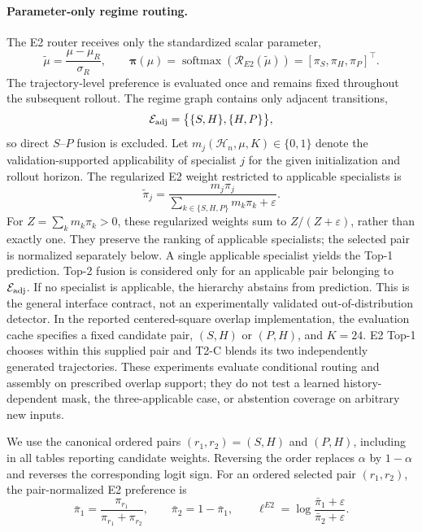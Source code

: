 \documentclass{article}
\begin{document}
\paragraph{Parameter-only regime routing.}
The E2 router receives only the standardized scalar parameter,
\begin{equation}
  \widetilde\mu
  =
  \frac{\mu-\mu_R}{\sigma_R},
  \qquad
  \bm\pi(\mu)
  =
  \operatorname{softmax}
  \left(
    \mathcal R_{E2}(\widetilde\mu)
  \right)
  =
  [\pi_S,\pi_H,\pi_P]^\top .
  \label{eq:app_e2_parameter_only}
\end{equation}
The trajectory-level preference is evaluated once and remains fixed
throughout the subsequent rollout. The regime graph contains only adjacent transitions,
\begin{equation}
  \mathcal E_{\rm adj}
  =
  \bigl\{
    \{S,H\},
    \{H,P\}
  \bigr\},
  \label{eq:app_adjacency}
\end{equation}
so direct $S$--$P$ fusion is excluded.
Let
$m_j(\mathcal H_n,\mu,K)\in\{0,1\}$
denote the validation-supported applicability of specialist $j$ for the
given initialization and rollout horizon.
The regularized E2 weight restricted to applicable specialists is
\begin{equation}
  \widetilde\pi_j
  =
  \frac{
    m_j\pi_j
  }{
    \sum_{k\in\{S,H,P\}}m_k\pi_k+\varepsilon
  }.
  \label{eq:app_masked_e2}
\end{equation}
For $Z=\sum_k m_k\pi_k>0$, these regularized weights sum to $Z/(Z+\varepsilon)$, rather than exactly one. They preserve the ranking of applicable specialists; the selected pair is normalized separately below. A single applicable specialist yields the Top-1 prediction.
Top-2 fusion is considered only for an applicable pair belonging to
$\mathcal E_{\rm adj}$.
If no specialist is applicable, the hierarchy abstains from prediction. This is the general interface contract, not an experimentally validated out-of-distribution detector. In the reported centered-square overlap implementation, the evaluation cache specifies a fixed candidate pair, $(S,H)$ or $(P,H)$, and $K=24$. E2 Top-1 chooses within this supplied pair and T2-C blends its two independently generated trajectories. These experiments evaluate conditional routing and assembly on prescribed overlap support; they do not test a learned history-dependent mask, the three-applicable case, or abstention coverage on arbitrary new inputs.

We use the canonical ordered pairs $(r_1,r_2)=(S,H)$ and $(P,H)$, including in all tables reporting candidate weights. Reversing the order replaces $\alpha$ by $1-\alpha$ and reverses the corresponding logit sign. For an ordered selected pair $(r_1,r_2)$, the pair-normalized E2
preference is
\begin{equation}
  \bar\pi_1
  =
  \frac{\pi_{r_1}}
       {\pi_{r_1}+\pi_{r_2}},
  \qquad
  \bar\pi_2
  =
  1-\bar\pi_1,
  \qquad
  \ell^{E2}
  =
  \log
  \frac{\bar\pi_1+\varepsilon}
       {\bar\pi_2+\varepsilon}.
  \label{eq:app_pair_logit}
\end{equation}
\end{document}
